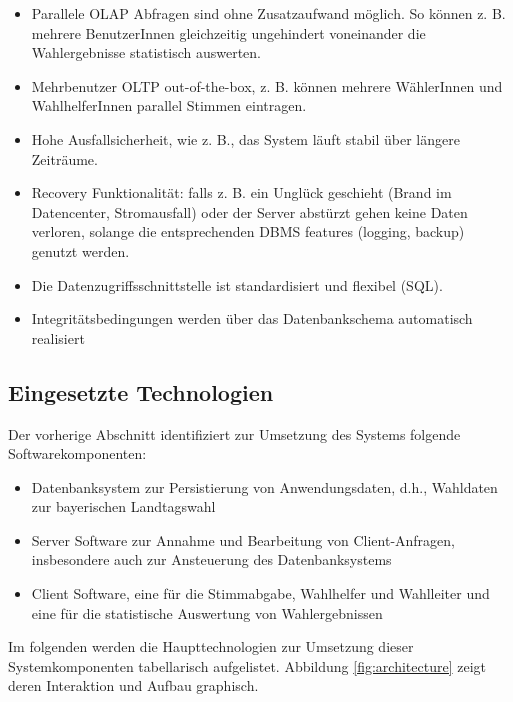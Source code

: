 \documentclass[a4paper,12pt]{article}
\begin{document}
\begin{itemize}
      \item Parallele OLAP Abfragen sind ohne Zusatzaufwand möglich. So können z. B. mehrere BenutzerInnen gleichzeitig ungehindert voneinander die Wahlergebnisse statistisch auswerten.
      \item Mehrbenutzer OLTP out-of-the-box, z. B. können mehrere WählerInnen und WahlhelferInnen parallel Stimmen
            eintragen.
      \item Hohe Ausfallsicherheit, wie z. B., das System läuft stabil über längere Zeiträume.
      \item Recovery Funktionalität: falls z. B. ein Unglück geschieht (Brand im Datencenter, Stromausfall) 
            oder der Server abstürzt gehen keine Daten verloren, solange die entsprechenden DBMS features 
            (logging, backup) genutzt werden.
      \item Die Datenzugriffsschnittstelle ist standardisiert und flexibel (SQL).
      \item Integritätsbedingungen werden über das Datenbankschema automatisch realisiert
\end{itemize}

\subsection{Eingesetzte Technologien}
Der vorherige Abschnitt identifiziert zur Umsetzung des Systems folgende Softwarekomponenten:
\begin{itemize}
      \item Datenbanksystem zur Persistierung von Anwendungsdaten, d.h., Wahldaten zur bayerischen Landtagswahl
      \item Server Software zur Annahme und Bearbeitung von Client-Anfragen, insbesondere auch zur Ansteuerung des Datenbanksystems
      \item Client Software, eine für die Stimmabgabe, Wahlhelfer und Wahlleiter und eine für die statistische Auswertung von Wahlergebnissen 
\end{itemize}
Im folgenden werden die Haupttechnologien zur Umsetzung dieser Systemkomponenten tabellarisch aufgelistet. Abbildung \ref{fig:architecture} zeigt
deren Interaktion und Aufbau graphisch.
\end{document}
